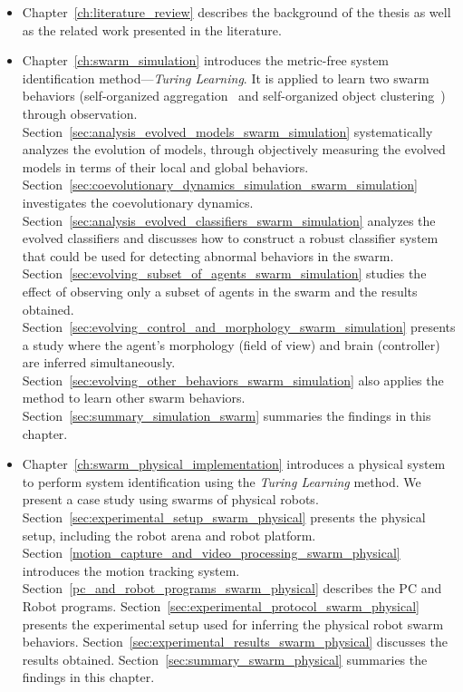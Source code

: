 \begin{itemize}
\item Chapter~\ref{ch:literature_review} describes the background of the thesis as well as the related work presented in the literature. 

\item Chapter~\ref{ch:swarm_simulation} introduces the metric-free system identification method---\textit{Turing Learning}. It is applied to learn two swarm behaviors (self-organized aggregation~\cite{Gauci2014_ijrr} and self-organized object clustering~\cite{Melvin2014_aamas}) through observation. Section~\ref{sec:analysis_evolved_models_swarm_simulation} systematically analyzes the evolution of models, through objectively measuring the evolved models in terms of their local and global behaviors. Section~\ref{sec:coevolutionary_dynamics_simulation_swarm_simulation} investigates the coevolutionary dynamics. 
Section~\ref{sec:analysis_evolved_classifiers_swarm_simulation} analyzes the evolved classifiers and discusses how to construct a robust classifier system that could be used for detecting abnormal behaviors in the swarm. Section~\ref{sec:evolving_subset_of_agents_swarm_simulation} studies the effect of observing only a subset of agents in the swarm and the results obtained. Section~\ref{sec:evolving_control_and_morphology_swarm_simulation} presents a study where the agent's morphology (field of view) and brain (controller) are inferred simultaneously.  Section~\ref{sec:evolving_other_behaviors_swarm_simulation} also applies the method to learn other swarm behaviors. Section~\ref{sec:summary_simulation_swarm} summaries the findings in this chapter.

\item Chapter~\ref{ch:swarm_physical_implementation} introduces a physical system to perform system identification using the \textit{Turing Learning} method. We present a case study using swarms of physical robots. Section~\ref{sec:experimental_setup_swarm_physical} presents the physical setup, including the robot arena and robot platform. Section~\ref{motion_capture_and_video_processing_swarm_physical} introduces the motion tracking system. Section~\ref{pc_and_robot_programs_swarm_physical} describes the PC and Robot programs. Section~\ref{sec:experimental_protocol_swarm_physical} presents the experimental setup used for inferring the physical robot swarm behaviors. Section~\ref{sec:experimental_results_swarm_physical} discusses the results obtained. Section~\ref{sec:summary_swarm_physical} summaries the findings in this chapter.


\end{itemize}

